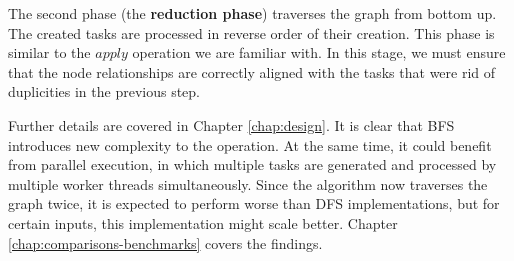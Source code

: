 The second phase (the \textbf{reduction phase}) traverses the graph from bottom up. The created tasks are processed
in reverse order of their creation. This phase is similar to the $apply$ operation we are familiar with. In this
stage, we must ensure that the node relationships are correctly aligned with the tasks that were rid of duplicities
in the previous step.

Further details are covered in Chapter \ref{chap:design}. It is clear that BFS introduces new complexity to the
operation. At the same time, it could benefit from parallel execution, in which multiple tasks are generated and
processed by multiple worker threads simultaneously. Since the algorithm now traverses the graph twice, it is
expected to perform worse than DFS implementations, but for certain inputs, this implementation might scale better.
Chapter \ref{chap:comparisons-benchmarks} covers the findings.
